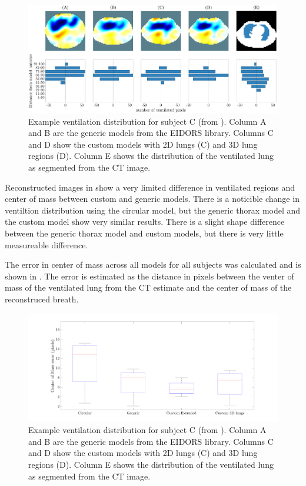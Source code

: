 \begin{figure}
	\centering
	\includegraphics[width=\textwidth]{chapter5-CT_to_mesh/imgs/center_of_vent_PT04.pdf}
	\caption[Example ventilation distributions]{\label{fig:c-of-m-results}%
	Example ventilation distribution for subject C (from ).
	Column A and B are the generic models from the EIDORS library. 
	Columns C and D show the custom models with 2D lungs (C) and 3D lung regions (D).
	Column E shows the distribution of the ventilated lung as segmented from the CT image. 
	}
\end{figure}

Reconstructed images in 
show a very limited difference in ventilated regions 
and center of mass between custom and generic models. There is a 
noticible change in ventiltion distribution using the circular model, but the 
generic thorax model and the custom model show very similar results. 
There is a slight shape difference between the generic thorax model 
and custom models, but there is very little measureable difference. 

The error in center of mass across all models for all subjects was calculated and is 
shown in . The error is estimated as the distance in pixels 
between the venter of mass of the ventilated lung from the CT estimate and the 
center of mass of the reconstruced breath. 

\begin{figure}
	\centering
	\includegraphics[width=\textwidth]{chapter5-CT_to_mesh/imgs/error_boxplot.pdf}
	\caption[Example ventilation distributions]{\label{fig:c-of-m-error}%
	Example ventilation distribution for subject C (from ).
	Column A and B are the generic models from the EIDORS library. 
	Columns C and D show the custom models with 2D lungs (C) and 3D lung regions (D).
	Column E shows the distribution of the ventilated lung as segmented from the CT image. 
	}
\end{figure}

